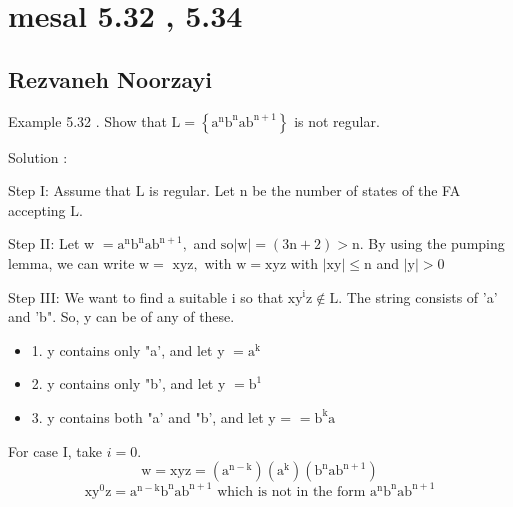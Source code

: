 \documentclass [7pt]{beamer}
\begin{document}
\small
\section*{mesal 5.32 , 5.34}
\subsection*{Rezvaneh Noorzayi }	
\begin{frame}
\justifying	
Example 5.32 . Show that $\mathrm{L}=\left\{\mathrm{a}^{\mathrm{n}} \mathrm{b}^{\mathrm{n}} \mathrm{ab}^{\mathrm{n}+1}\right\}$ is not regular.
\begin{flushleft}
Solution :
\end{flushleft}
Step I: Assume that $\mathrm{L}$ is regular. Let $\mathrm{n}$ be the number of states of the FA accepting $\mathrm{L}$.
\begin{flushleft}
Step II: Let w $=\mathrm{a}^{\mathrm{n}} \mathrm{b}^{\mathrm{n}} \mathrm{ab}^{\mathrm{n}+1},$ and $\mathrm{so}|\mathrm{w}|=(3 \mathrm{n}+2)>\mathrm{n} .$ By using the pumping lemma, we can write $\mathrm{w}=$
$\mathrm{xyz},$ with $\mathrm{w}=\mathrm{xyz}$ with $|\mathrm{xy}| \leq \mathrm{n}$ and $|\mathrm{y}|>0$
\end{flushleft}
\begin{flushleft}
Step III: We want to find a suitable i so that $\mathrm{xy}^{\mathrm{i}} \mathrm{z} \notin \mathrm{L}$. The string consists of 'a' and 'b". So, y can be of any of these.
\end{flushleft}
\begin{itemize}
\item	
1. y contains only "a', and let y $=\mathrm{a}^{\mathrm{k}}$
\item
2. y contains only "b', and let y $=\mathrm{b}^{1}$
\item
3. y contains both "a' and "b', and let y = $=\mathrm{b}^{\mathrm{k}}\mathrm{a} $
\end{itemize}
\justifying			
For case I, take $i=0$.
$$
\mathrm{w}=\mathrm{xyz}=\left(\mathrm{a}^{\mathrm{n}-\mathrm{k}}\right)\left(\mathrm{a}^{\mathrm{k}}\right)\left(\mathrm{b}^{\mathrm{n}} \mathrm{a} \mathrm{b}^{\mathrm{n}+1}\right)
$$
$$
\mathrm{xy}^{0} \mathrm{z}=\mathrm{a}^{\mathrm{n}-\mathrm{k}} \mathrm{b}^{\mathrm{n}} \mathrm{a} \mathrm{b}^{\mathrm{n}+1} \text { which is not in the form } \mathrm{a}^{\mathrm{n}} \mathrm{b}^{\mathrm{n}} \mathrm{ab}^{\mathrm{n} + {1}}
$$
\end{frame}
\end{document}

